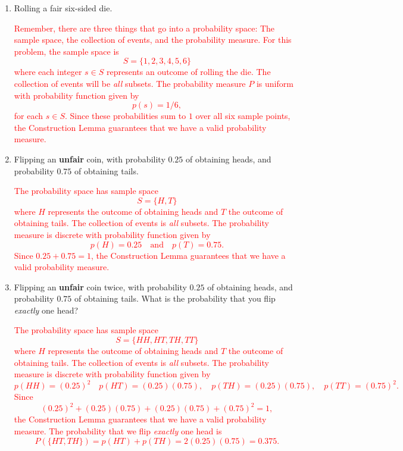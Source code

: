 \documentclass[12pt,reqno]{amsart}
\begin{document}
\medskip
\begin{enumerate}
    \item Rolling a fair six-sided die.

    \bigskip
    \textcolor{red}{Remember, there are three things that go into a probability space: The sample space, the collection of events, and the probability measure. For this problem, the sample space is
        \[S = \{ 1, 2, 3, 4, 5, 6\}\]
    where each integer $s\in S$ represents an outcome of rolling the die. The collection of events will be \textit{all} subsets. The probability measure $P$ is uniform with probability function given by
        \[p(s) = 1/6,\]
    for each $s\in S$. Since these probabilities sum to $1$ over all six sample points, the Construction Lemma guarantees that we have a valid probability measure.}
    \bigskip

    \item Flipping an \textbf{unfair} coin, with probability $0.25$ of obtaining heads, and probability $0.75$ of obtaining tails.
    
    \bigskip
    \textcolor{red}{The probability space has sample space
        \[S = \{H,T\}\]
    where $H$ represents the outcome of obtaining heads and $T$ the outcome of obtaining tails. The collection of events is \textit{all} subsets. The probability measure is discrete with probability function given by
        \[p(H) = 0.25 \quad \text{and} \quad p(T) = 0.75.\]
    Since $0.25+0.75=1$, the Construction Lemma guarantees that we have a valid probability measure.}
    \bigskip

    \item Flipping an \textbf{unfair} coin twice, with probability $0.25$ of obtaining heads, and probability $0.75$ of obtaining tails. What is the probability that you flip \textit{exactly} one head?
    
    \bigskip
    \textcolor{red}{The probability space has sample space
        \[S = \{HH,HT, TH, TT\}\]
    where $H$ represents the outcome of obtaining heads and $T$ the outcome of obtaining tails. The collection of events is \textit{all} subsets. The probability measure is discrete with probability function given by
        \[p(HH) = (0.25)^2 \quad p(HT) = (0.25)(0.75), \quad p(TH)= (0.25)(0.75), \quad p(TT) = (0.75)^2 .\]
    Since
        \[(0.25)^2 + (0.25)(0.75) + (0.25)(0.75) + (0.75)^2 = 1,\]
    the Construction Lemma guarantees that we have a valid probability measure. The probability that we flip \textit{exactly} one head is
        \[P(\{HT,TH\}) = p(HT) + p(TH) = 2(0.25)(0.75) = 0.375.\]}
    \bigskip


\end{enumerate}
\end{document}
